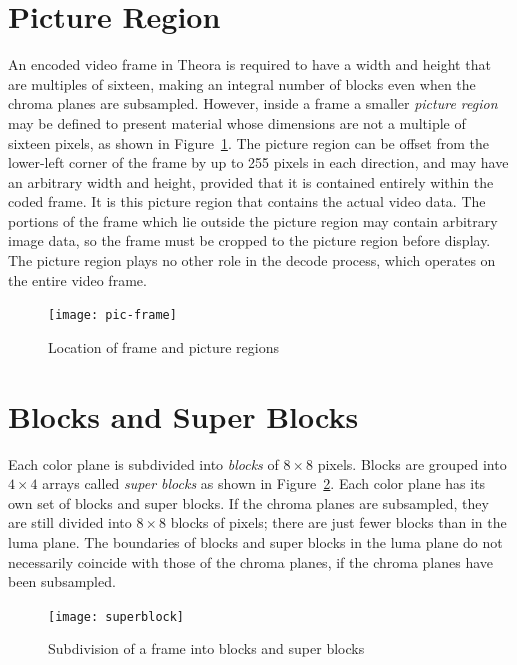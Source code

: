 \documentclass[9pt,letterpaper]{book}
\newcommand{\term}[1]{{\em #1}}
\numberwithin{equation}{chapter}
\numberwithin{figure}{chapter}
\numberwithin{table}{chapter}
\begin{document}
\section{Picture Region}

An encoded video frame in Theora is required to have a width and height that
 are multiples of sixteen, making an integral number of blocks even when the
 chroma planes are subsampled.
However, inside a frame a smaller \term{picture region} may be defined
 to present material whose dimensions are not a multiple of sixteen pixels, as
 shown in Figure~\ref{fig:pic-frame}.
The picture region can be offset from the lower-left corner of the frame by up
 to 255 pixels in each direction, and may have an arbitrary width and height,
 provided that it is contained entirely within the coded frame.
It is this picture region that contains the actual video data.
The portions of the frame which lie outside the picture region may contain
 arbitrary image data, so the frame must be cropped to the picture region
 before display.
The picture region plays no other role in the decode process, which operates on
 the entire video frame.

\begin{figure}[htbp]
\begin{center}
\texttt{[image: pic-frame]}
\end{center}
\caption{Location of frame and picture regions}
\label{fig:pic-frame}
\end{figure}

\section{Blocks and Super Blocks}
\label{sec:blocks-and-sbs}

Each color plane is subdivided into \term{blocks} of $8\times 8$ pixels.
Blocks are grouped into $4\times 4$ arrays called \term{super blocks} as
 shown in Figure~\ref{fig:superblock}.
Each color plane has its own set of blocks and super blocks.
If the chroma planes are subsampled, they are still divided into $8\times 8$
 blocks of pixels; there are just fewer blocks than in the luma plane.
The boundaries of blocks and super blocks in the luma plane do not necessarily
 coincide with those of the chroma planes, if the chroma planes have been
 subsampled.

\begin{figure}[htbp]
\begin{center}
\texttt{[image: superblock]}
\end{center}
\caption{Subdivision of a frame into blocks and super blocks}
\label{fig:superblock}
\end{figure}
\end{document}
